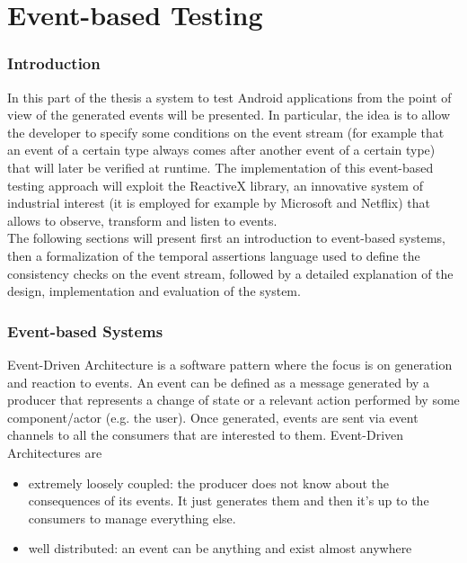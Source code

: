 \documentclass[11pt,a4paper,notitlepage]{article}
\begin{document}

\part{Event-based Testing}

\section{Introduction}
In this part of the thesis a system to test Android applications from the point of view of the generated events will be presented. In particular, the idea is to allow the developer to specify some conditions on the event stream (for example that an event of a certain type always comes after another event of a certain type) that will later be verified at runtime. The implementation of this event-based testing approach will exploit the ReactiveX library, an innovative system of industrial interest (it is employed for example by Microsoft and Netflix) that allows to observe, transform and listen to events.\medskip \\
The following sections will present first an introduction to event-based systems, then a formalization of the temporal assertions language used to define the consistency checks on the event stream, followed by a detailed explanation of the design, implementation and evaluation of the system.

\section{Event-based Systems}
Event-Driven Architecture is a software pattern where the focus is on generation and reaction to events. An event can be defined as a message generated by a producer that represents a change of state or a relevant action performed by some component/actor (e.g. the user). Once generated, events are sent via event channels to all the consumers that are interested to them. Event-Driven Architectures are
\begin{itemize}
	\item extremely loosely coupled: the producer does not know about the consequences of its events. It just generates them and then it's up to the consumers to manage everything else.
	\item well distributed: an event can be anything and exist almost anywhere
\end{itemize}
\end{document}
